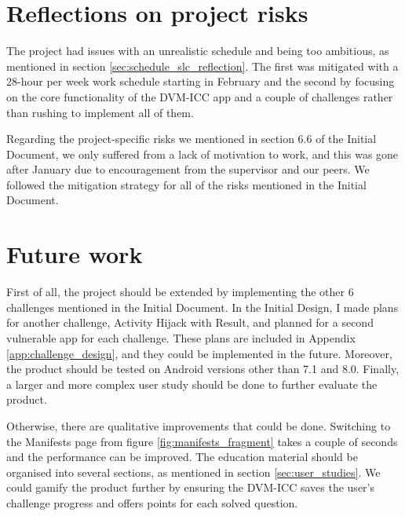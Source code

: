 	\vspace{-2mm}
	\section{Reflections on project risks}
	    \label{sec:risks_reflection}
	\vspace{-2mm}
	    
	The project had issues with an unrealistic schedule and being too ambitious, as mentioned in section \ref{sec:schedule_slc_reflection}. The first was mitigated with a 28-hour per week work schedule starting in February and the second by focusing on the core functionality of the DVM-ICC app and a couple of challenges rather than rushing to implement all of them.
	
	Regarding the project-specific risks we mentioned in section 6.6 of the Initial Document, we only suffered from a lack of motivation to work, and this was gone after January due to encouragement from the supervisor and our peers. We followed the mitigation strategy for all of the risks mentioned in the Initial Document.
	
	\vspace{-3mm}
	\section{Future work}
	    \label{sec:further_work}
	\vspace{-2mm}
	    
	First of all, the project should be extended by implementing the other 6 challenges mentioned in the Initial Document. In the Initial Design, I made plans for another challenge, Activity Hijack with Result, and planned for a second vulnerable app for each challenge. These plans are included in Appendix \ref{app:challenge_design}, and they could be implemented in the future. Moreover, the product should be tested on Android versions other than 7.1 and 8.0. Finally, a larger and more complex user study should be done to further evaluate the product.
	
	Otherwise, there are qualitative improvements that could be done. Switching to the Manifests page from figure \ref{fig:manifests_fragment} takes a couple of seconds and the performance can be improved. The education material should be organised into several sections, as mentioned in section \ref{sec:user_studies}. We could gamify the product further by ensuring the DVM-ICC saves the user's challenge progress and offers points for each solved question.
	

